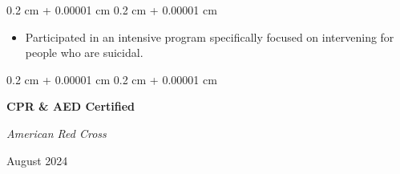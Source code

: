 \documentclass[10pt, letterpaper]{article}
\newenvironment{highlights}{
    \begin{itemize}[
        topsep=0.10 cm,
        parsep=0.10 cm,
        partopsep=0pt,
        itemsep=0pt,
        leftmargin=0.4 cm + 10pt
    ]
}{
    \end{itemize}
} %
\newenvironment{highlightsforbulletentries}{
    \begin{itemize}[
        topsep=0.10 cm,
        parsep=0.10 cm,
        partopsep=0pt,
        itemsep=0pt,
        leftmargin=10pt
    ]
}{
    \end{itemize}
} %
\newenvironment{onecolentry}{
    \begin{adjustwidth}{
        0.2 cm + 0.00001 cm
    }{
        0.2 cm + 0.00001 cm
    }
}{
    \end{adjustwidth}
} %
\newenvironment{twocolentry}[2][]{
    \onecolentry
    \def\secondColumn{#2}
    \setcolumnwidth{\fill, 4.5 cm}
    \begin{paracol}{2}
}{
    \switchcolumn \raggedleft \secondColumn
    \end{paracol}
    \endonecolentry
} %
\begin{document}
\vspace{0.10 cm}
\begin{onecolentry}
    \begin{highlights}
        \item Participated in an intensive program specifically focused on intervening for people who are suicidal.
    \end{highlights}
\end{onecolentry}



\vspace{0.2 cm}

\begin{twocolentry}{
        

        August 2024}
    \textbf{CPR \& AED Certified}

    \textit{American Red Cross}
\end{twocolentry}

\end{document}
